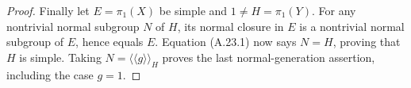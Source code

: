 \begin{proof}
Finally let $E=\pi_1(X)$ be simple and $1\ne H=\pi_1(Y)$.
For any nontrivial normal subgroup $N$ of $H$, its normal closure
in $E$ is a nontrivial normal subgroup of $E$, hence equals $E$.
Equation (A.23.1) now says $N=H$, proving that $H$ is simple.
Taking $N=\langle\!\langle g\rangle\!\rangle_H$ proves the
last normal-generation assertion, including the case $g=1$.
\end{proof}
